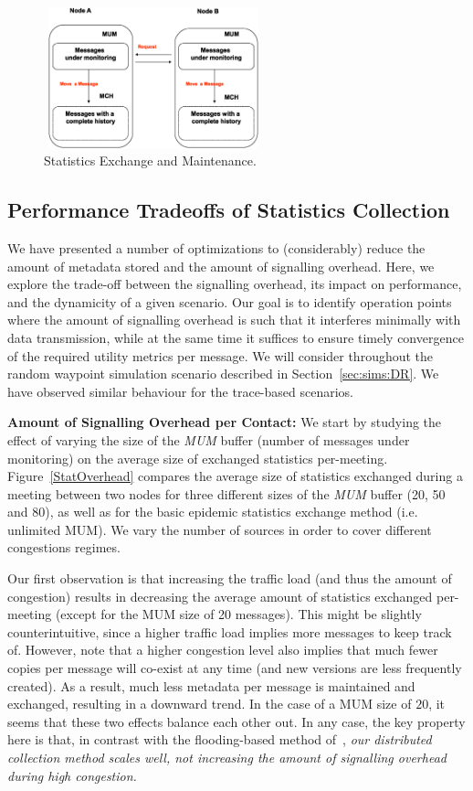 \begin{figure}
\centering
\includegraphics[width=2.5in,height=1.6in]{Chapitre3/StatisticsExchanging.eps}
\caption{Statistics Exchange and Maintenance.}
\label{SE}
\end{figure}

\subsection{Performance Tradeoffs of Statistics Collection}
\label{PENHCM}

We have presented a number of optimizations to (considerably) reduce the amount of metadata stored and the amount of signalling overhead. Here, we explore the trade-off between the signalling overhead, its impact on performance, and the dynamicity of a given scenario. Our goal is to identify operation points where the amount of signalling overhead is such that it interferes minimally with data transmission, while at the same time it suffices to ensure timely convergence of the required utility metrics per message. We will consider throughout the random waypoint simulation scenario described in Section~\ref{sec:sims:DR}. We have observed similar behaviour for the trace-based scenarios.

\textbf{Amount of Signalling Overhead per Contact:} We start by studying the effect of varying the size of the \emph{MUM} buffer (number of messages under monitoring) on the average size of exchanged statistics per-meeting. Figure~\ref{StatOverhead} compares the average size of statistics exchanged during a meeting between two nodes for three different sizes of the \emph{MUM} buffer (20, 50 and 80), as well as for the basic epidemic statistics exchange method (i.e. unlimited MUM). We vary the number of sources in order to cover different congestions regimes.

Our first observation is that increasing the traffic load (and thus the amount of congestion) results in decreasing the average amount of statistics exchanged per-meeting (except for the MUM size of 20 messages). This might be slightly counterintuitive, since a higher traffic load implies more messages to keep track of. However, note that a higher congestion level also implies that much fewer copies per message will co-exist at any time (and new versions are less frequently created). As a result, much less metadata per message is maintained and exchanged, resulting in a downward trend. In the case of a MUM size of $20$, it seems that these two effects balance each other out. In any case, the key property here is that, in contrast with the flooding-based method of~\cite{Levine:Sigcomm07}, \emph{our distributed collection method scales well, not increasing the amount of signalling overhead during high congestion.}

